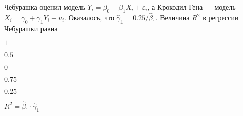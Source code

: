 
\begin{question}
Чебурашка оценил модель \(Y_i = \beta_0 + \beta_1 X_i + \varepsilon_i\),
а Крокодил Гена --- модель \(X_i = \gamma_0 + \gamma_1 Y_i + u_i\).
Оказалось, что \(\hat\gamma_1 = 0.25/\hat\beta_1\). Величина \(R^2\) в
регрессии Чебурашки равна
\begin{answerlist}
  \item \(1\)
  \item \(0.5\)
  \item \(0\)
  \item \(0.75\)
  \item \(0.25\)
\end{answerlist}
\end{question}

\begin{solution}
\(R^2 = \hat\beta_1 \cdot \hat\gamma_1\)
\end{solution}

